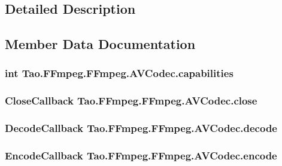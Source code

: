 \subsection{Detailed Description}


\subsection{Member Data Documentation}
\hypertarget{struct_tao_1_1_f_fmpeg_1_1_f_fmpeg_1_1_a_v_codec_a42926fb934e84565fdc5eba55b0291ef}{
\subsubsection[{capabilities}]{\setlength{\rightskip}{0pt plus 5cm}int {\bf Tao.FFmpeg.FFmpeg.AVCodec.capabilities}}}
\label{struct_tao_1_1_f_fmpeg_1_1_f_fmpeg_1_1_a_v_codec_a42926fb934e84565fdc5eba55b0291ef}
\hypertarget{struct_tao_1_1_f_fmpeg_1_1_f_fmpeg_1_1_a_v_codec_a1f55fd487e07c8c286f00d9b709a7b80}{
\subsubsection[{close}]{\setlength{\rightskip}{0pt plus 5cm}CloseCallback {\bf Tao.FFmpeg.FFmpeg.AVCodec.close}}}
\label{struct_tao_1_1_f_fmpeg_1_1_f_fmpeg_1_1_a_v_codec_a1f55fd487e07c8c286f00d9b709a7b80}
\hypertarget{struct_tao_1_1_f_fmpeg_1_1_f_fmpeg_1_1_a_v_codec_aa361a2b8a1934cc3e96cd3f989e873d0}{
\subsubsection[{decode}]{\setlength{\rightskip}{0pt plus 5cm}DecodeCallback {\bf Tao.FFmpeg.FFmpeg.AVCodec.decode}}}
\label{struct_tao_1_1_f_fmpeg_1_1_f_fmpeg_1_1_a_v_codec_aa361a2b8a1934cc3e96cd3f989e873d0}
\hypertarget{struct_tao_1_1_f_fmpeg_1_1_f_fmpeg_1_1_a_v_codec_a43ff4d62441c021514988adf3d5c8e8f}{
\subsubsection[{encode}]{\setlength{\rightskip}{0pt plus 5cm}EncodeCallback {\bf Tao.FFmpeg.FFmpeg.AVCodec.encode}}}
